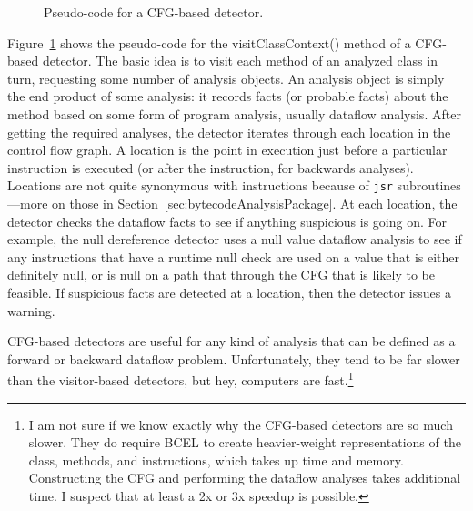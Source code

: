 \documentclass[11pt]{article}
\newcommand{\Indent}{\hskip .25in}
\newcommand{\ForEach}{{\bf for each}}
\newcommand{\Do}{{\bf do}}
\newcommand{\If}{{\bf if}}
\newcommand{\Then}{{\bf then}}
\newcommand{\EndFor}{{\bf end for}}
\newcommand{\EndIf}{{\bf end if}}
\begin{document}
\begin{figure}
\caption{Pseudo-code for a CFG-based detector.}\label{fig:cfgBasedDetector}
\end{figure}

Figure~\ref{fig:cfgBasedDetector} shows the pseudo-code for the
visitClassContext() method of a CFG-based detector.
The basic idea is to visit each method of an analyzed class in turn,
requesting some number of analysis objects.  An analysis object
is simply the end product of some analysis: it records facts 
(or probable facts) about the method based on some form of program
analysis, usually dataflow analysis.
After getting the required analyses, the detector iterates through
each location in the control flow graph.  A location is
the point in execution just before a particular instruction is executed
(or after the instruction, for backwards analyses).  Locations are not quite synonymous
with instructions because of {\tt jsr} subroutines---more on those
in Section~\ref{sec:bytecodeAnalysisPackage}.  At each location,
the detector checks the dataflow facts to see if anything suspicious is
going on.  For example, the null dereference detector uses a null value
dataflow analysis to see if any instructions that have a runtime null
check are used on a value that is either definitely null, or is null
on a path that through the CFG that is likely to be feasible.
If suspicious facts are detected at a location, then the detector issues a warning.

CFG-based detectors are useful for any kind of analysis that can be
defined as a forward or backward dataflow problem.  Unfortunately,
they tend to be far slower than the visitor-based detectors, but hey,
computers are fast.\footnote{I am not sure if we know exactly why the
CFG-based detectors are so much slower.  They do require BCEL to create
heavier-weight representations of the class, methods, and instructions,
which takes up time and memory.  Constructing the CFG and performing the
dataflow analyses takes additional time.  I suspect that at least a 2x or 3x
speedup is possible.}
\end{document}
